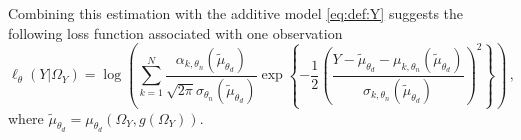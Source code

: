 \documentclass{article}
\begin{document}
Combining this estimation with the additive model  \eqref{eq:def:Y} suggests the following loss function associated with one observation
$$
\ell_{\theta}(Y|\Omega_{Y}) = \log\left(\sum_{k=1}^N\frac{\alpha_{k,\theta_n}(\tilde\mu_{\theta_d})}{\sqrt{2\pi }\sigma_{\theta_n}(\tilde\mu_{\theta_d})}\exp\left\{-\frac{1}{2}\left(\frac{Y-\tilde\mu_{\theta_d} -  \mu_{k,\theta_n}(\tilde\mu_{\theta_d})}{\sigma_{k,\theta_n}(\tilde\mu_{\theta_d})}\right)^2\right\}\right)\,,
$$
where $\tilde \mu_{\theta_d} = \mu_{\theta_d}(\Omega_{Y},g(\Omega_{Y}))$.
%
\end{document}
